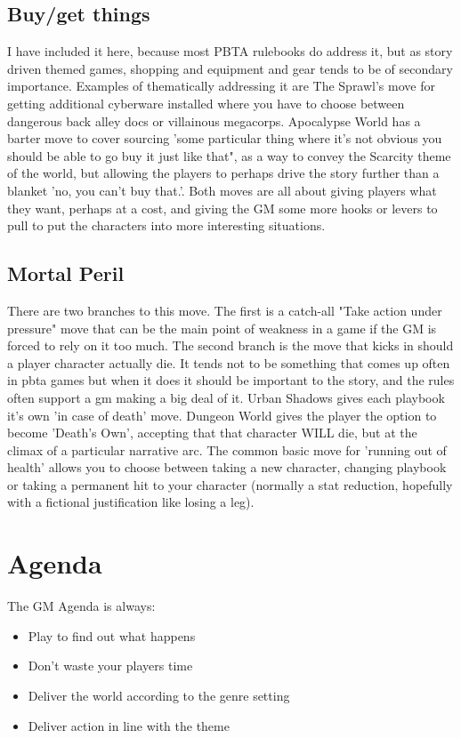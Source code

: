 \documentclass{tufte-handout}
\begin{document}
\subsection{Buy/get things}
I have included it here, because most PBTA rulebooks do address it, but as story driven themed games, shopping and equipment and gear tends to be of secondary importance. Examples of thematically addressing it are The Sprawl's move for getting additional cyberware installed where you have to choose between dangerous back alley docs or villainous megacorps. 
Apocalypse World has a barter move to cover sourcing 'some particular thing where it's not obvious you should be able to go buy it just like that", as a way to convey the Scarcity theme of the world, but allowing the players to perhaps drive the story further than a blanket 'no, you can't buy that.'. 
Both moves are all about giving players what they want, perhaps at a cost, and giving the GM some more hooks or levers to pull to put the characters into more interesting situations.

\subsection{Mortal Peril}
There are two branches to this move. The first is a catch-all "Take action under pressure" move that can be the main point of weakness in a game if the GM is forced to rely on it too much. 
The second branch is the move that kicks in should a player character actually die. It tends not to be something that comes up often in pbta games but when it does it should be important to the story, and the rules often support a gm making a big deal of it. Urban Shadows gives each playbook it's own 'in case of death' move. Dungeon World gives the player the option to become 'Death's Own', accepting that that character WILL die, but at the climax of a particular narrative arc.
The common basic move for 'running out of health' allows you to choose between taking a new character, changing playbook or taking a permanent hit to your character (normally a stat reduction, hopefully with a fictional justification like losing a leg). 

\section{Agenda}
The GM Agenda is always:

\begin{itemize}
\item Play to find out what happens
\item Don't waste your players time
\item Deliver the world according to the genre setting
\item Deliver action in line with the theme
\end{itemize}
\end{document}
